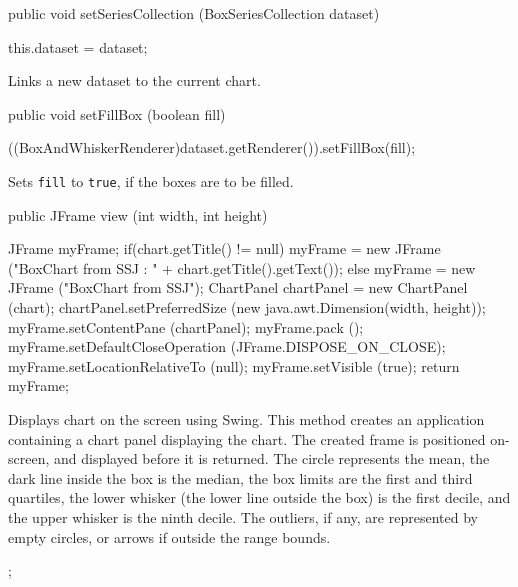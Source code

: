 \begin{code}

   public void setSeriesCollection (BoxSeriesCollection dataset) \begin{hide} {
      this.dataset = dataset;
   }\end{hide}
\end{code}
\begin{tabb}
   Links a new dataset to the current chart.
\end{tabb}
\begin{htmlonly}
\end{htmlonly}
\begin{code}

   public void setFillBox (boolean fill) \begin{hide} {
      ((BoxAndWhiskerRenderer)dataset.getRenderer()).setFillBox(fill);
   }\end{hide}
\end{code}
\begin{tabb}
   Sets \texttt{fill} to \texttt{true}, if the boxes are to be filled.
\end{tabb}
\begin{htmlonly}
\end{htmlonly}
\begin{code}

   public JFrame view (int width, int height) \begin{hide} {
      JFrame myFrame;
      if(chart.getTitle() != null)
         myFrame = new JFrame ("BoxChart from SSJ : " + chart.getTitle().getText());
      else
         myFrame = new JFrame ("BoxChart from SSJ");
      ChartPanel chartPanel = new ChartPanel (chart);
      chartPanel.setPreferredSize (new java.awt.Dimension(width, height));
      myFrame.setContentPane (chartPanel);
      myFrame.pack ();
      myFrame.setDefaultCloseOperation (JFrame.DISPOSE_ON_CLOSE);
      myFrame.setLocationRelativeTo (null);
      myFrame.setVisible (true);
      return myFrame;
   }\end{hide}
\end{code}
\begin{tabb}
   Displays chart on the screen using Swing.
   This method creates an application containing a chart panel displaying
   the chart.  The created frame is positioned on-screen, and displayed before
   it is returned. The circle represents the mean, the dark line inside the box
   is the median, the box limits are the first and third quartiles,
   the lower whisker (the lower line outside the box) is the first decile,
   and the upper whisker is the ninth decile. The outliers, if any, are
   represented by empty circles, or arrows if outside the range bounds.
\end{tabb}
\begin{htmlonly}
   ;
\end{htmlonly}

